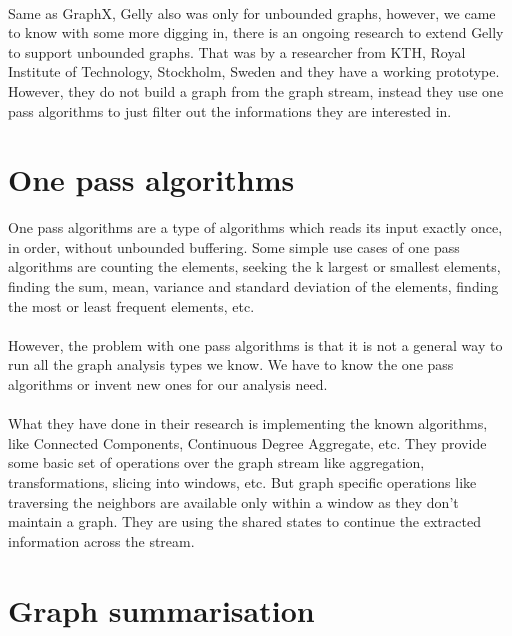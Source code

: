 \documentclass[12pt]{report}
\numberwithin{figure}{section}
\numberwithin{table}{section}
\begin{document}
\paragraph{}

Same as GraphX, Gelly also was only for unbounded graphs, however, we came to know with some more digging in, there is an ongoing research to extend Gelly to support unbounded graphs. That was by a researcher from KTH, Royal Institute of Technology, Stockholm, Sweden and they have a working prototype. However, they do not build a graph from the graph stream, instead they use one pass algorithms to just filter out the informations they are interested in. 


\section{One pass algorithms}

One pass algorithms are a type of algorithms which reads its input exactly once, in order, without unbounded buffering. Some simple use cases of one pass algorithms are counting the elements, seeking the k largest or smallest elements, finding the sum, mean, variance and standard deviation of the elements, finding the most or least frequent elements, etc. 

\paragraph{}

However, the problem with one pass algorithms is that it is not a general way to run all the graph analysis types we know. We have to know the one pass algorithms or invent new ones for our analysis need. 

\paragraph{}

What they have done in their research is implementing the known algorithms, like Connected Components, Continuous Degree Aggregate, etc. They provide some basic set of operations over the graph stream like aggregation, transformations, slicing into windows, etc. But graph specific operations like traversing the neighbors are available only within a window as they don’t maintain a graph. They are using the shared states to continue the extracted information across the stream.

\section{Graph summarisation}
\end{document}
